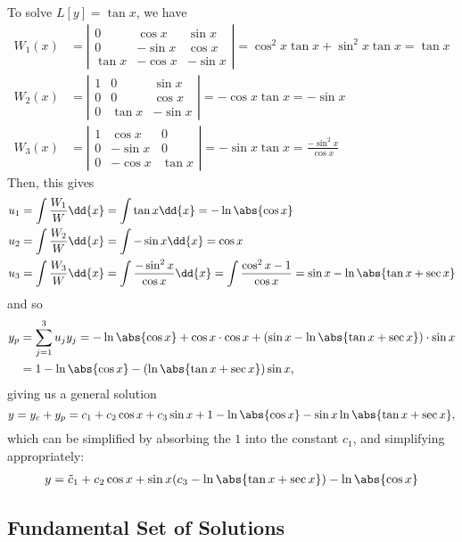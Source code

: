 {\begin{example}
    To solve $L[y] = \tan x$, we have\begin{align*}
        W_1(x) &= \left|\begin{matrix}
            0 & \cos x & \sin x\\
            0 & - \sin x & \cos x\\
            \tan x & -\cos x & - \sin x
        \end{matrix}\right| =  \cos^2 x \tan x + \sin^2x \tan x = \tan x\\
        W_2(x) &= \left|\begin{matrix}
            1 & 0 & \sin x\\
            0 & 0 & \cos x\\
            0 & \tan x& - \sin x
        \end{matrix}\right| = - \cos x \tan x = - \sin x\\
        W_3(x) &= \left|\begin{matrix}
            1 & \cos x & 0\\
            0 & - \sin x & 0\\
            0 & - \cos x & \tan x
        \end{matrix}\right| = - \sin x \tan x = \frac{- \sin^2x}{\cos x}
    \end{align*}
    Then, this gives \begin{align*}
        u_1 &= \int \frac{W_1}{W} \dd{x} = \int \tan x \dd{x} = - \ln \abs{\cos x}\\
        u_2 &= \int \frac{W_2}{W} \dd{x} = \int - \sin x \dd{x} = \cos x\\
        u_3 &= \int \frac{W_3}{W} \dd{x} = \int \frac{- \sin^2 x}{\cos x} \dd{x} = \int \frac{\cos^2 x - 1}{\cos x} =\sin x - \ln \abs{\tan x + \sec x}
    \end{align*}
    and so \begin{align*}
        y_p &= \sum_{j=1}^{3} u_j y_j = - \ln \abs{\cos x} + \cos x \cdot \cos x + (\sin x - \ln \abs{ \tan x + \sec x}) \cdot \sin x\\
        &= 1 - \ln \abs{\cos x} - (\ln \abs{ \tan x + \sec x})\sin x,
    \end{align*}
    giving us a general solution $$
    y = y_c + y_p = c_1 + c_2 \cos x + c_3 \sin x + 1 - \ln \abs{ \cos x} - \sin x \ln \abs{ \tan x + \sec x},
    $$
    which can be simplified by absorbing the $1$ into the constant $c_1$, and simplifying appropriately:
    \begin{align*}
        y = \tilde c_1 + c_2 \cos x + \sin x (c_3 - \ln \abs{\tan x + \sec x})-\ln \abs{\cos x}
    \end{align*} 
\end{example}}

\subsection{Fundamental Set of Solutions}

